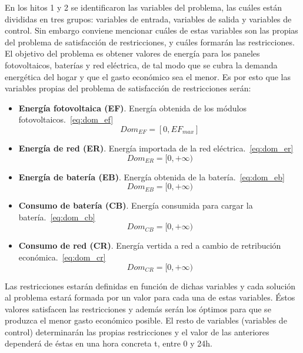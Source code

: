 En los hitos 1 y 2 se identificaron las variables del problema, las cuáles están divididas en tres grupos: variables de entrada, variables de salida y variables de control. Sin embargo conviene mencionar cuáles de estas variables son las propias del problema de satisfacción de restricciones, y cuáles formarán las restricciones. El objetivo del problema es obtener valores de energía para los paneles fotovoltaicos, baterías y red eléctrica, de tal modo que se cubra la demanda energética del hogar y que el gasto económico sea el menor. Es por esto que las variables propias del problema de satisfacción de restricciones serán:
\begin{itemize}
\item \textbf{Energía fotovoltaica (EF)}. Energía obtenida de los módulos fotovoltaicos.~\ref{eq:dom_ef}
\begin{equation}
        \label{eq:dom_ef}
        Dom_{EF} = [0, EF_{max}]
\end{equation}
\item \textbf{Energía de red (ER)}. Energía importada de la red eléctrica.~\ref{eq:dom_er}
\begin{equation}
        \label{eq:dom_er}
        Dom_{ER} = [0, +\infty)
\end{equation}
\item \textbf{Energía de batería (EB)}. Energía obtenida de la batería.~\ref{eq:dom_eb}
\begin{equation}
        \label{eq:dom_eb}
        Dom_{EB} = [0, +\infty)
\end{equation}
\item \textbf{Consumo de batería (CB)}. Energía consumida para cargar la batería.~\ref{eq:dom_cb}
\begin{equation}
        \label{eq:dom_cb}
        Dom_{CB} = [0, +\infty)
\end{equation}
\item \textbf{Consumo de red (CR)}. Energía vertida a red a cambio de retribución económica.~\ref{eq:dom_cr}
\begin{equation}
        \label{eq:dom_cr}
        Dom_{CR} = [0, +\infty)
\end{equation}
\end{itemize}

Las restricciones estarán definidas en función de dichas variables y cada solución al problema estará formada por un valor para cada una de estas variables. Éstos valores satisfacen las restricciones y además serán los óptimos para que se produzca el menor gasto económico posible. El resto de variables (variables de control) determinarán las propias restricciones y el valor de las anteriores dependerá de éstas en una hora concreta t, entre 0 y 24h.\\

